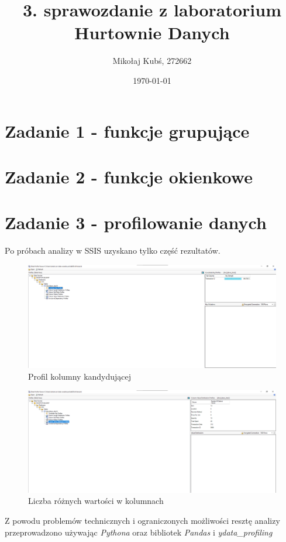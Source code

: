 \documentclass[a4paper,12pt]{article}
\title{3. sprawozdanie z laboratorium Hurtownie Danych}
\author{Mikołaj Kubś, 272662}
\date{\today}
\begin{document}
\maketitle

\section{Zadanie 1 - funkcje grupujące}

\section{Zadanie 2 - funkcje okienkowe}

\section{Zadanie 3 - profilowanie danych}

Po próbach analizy w SSIS uzyskano tylko część rezultatów.

\begin{figure}[H]
  \centering
  \includegraphics[width=1.0\textwidth]{images/ssis_1.png}
  \caption{Profil kolumny kandydującej}
\end{figure}

\begin{figure}[H]
  \centering
  \includegraphics[width=1.0\textwidth]{images/ssis_2.png}
  \caption{Liczba różnych wartości w kolumnach}
\end{figure}

Z powodu problemów technicznych i ograniczonych możliwości resztę analizy przeprowadzono używając \textit{Pythona} oraz bibliotek \textit{Pandas} i \textit{ydata\_profiling}

\printbibliography
\end{document}
